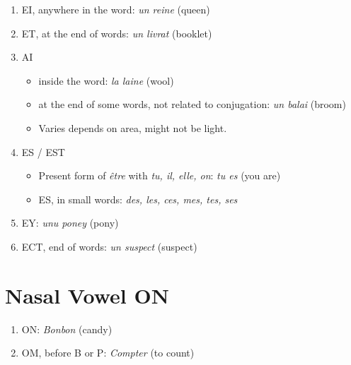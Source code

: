\documentclass{book}
\begin{document}
\begin{enumerate}
\begin{itemize}
                    \item Imparfait form with \textit{Ils, elles}: \textit{ils mangeaient} \textipa{[il m\~{a}ZE]} (they were eating)
                    \item COnditionel form with \textit{Ils, elles}: \textit{ils mangeraient} \textipa{[il m\~{a}gR@]} (they would eat)
                \end{itemize}
            \item EI, anywhere in the word: \textit{un reine} \textipa{[œR@n]} (queen)
            \item ET, at the end of words: \textit{un livrat} \textipa{[livrE]} (booklet)
            \item AI
                \begin{itemize}
                    \item inside the word: \textit{la laine} \textipa{[lE lEn]} (wool)
                    \item at the end of some words, not related to conjugation: \textit{un balai} \textipa{[bale]} (broom)
                    \item Varies depends on area, might not be light.
                \end{itemize}
            \item ES / EST
                \begin{itemize}
                    \item Present form of \textit{être} with \textit{tu, il, elle, on}: \textit{tu es} \textipa{[ty E]} (you are)
                    \item ES, in small words: \textit{des, les, ces, mes, tes, ses}
                \end{itemize}
            \item EY: \textit{unu poney} \textipa{[yn@ pOnE]} (pony)
            \item ECT, end of words: \textit{un suspect} \textipa{[syspE]} (suspect)
        \end{enumerate}

    \section{Nasal Vowel ON}
        \begin{enumerate}
            \item ON: \textit{Bonbon} \textipa{[b\~{O}b\~{O}]} (candy)
            \item OM, before B or P: \textit{Compter} \textipa{[k\~{O}te]} (to count)
        \end{enumerate}
\end{document}
